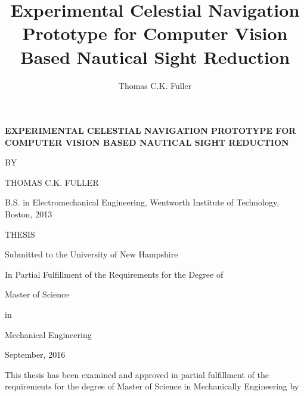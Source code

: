 \documentclass[12pt,a4paper]{book}
\author{Thomas C.K. Fuller}
\title{Experimental Celestial Navigation Prototype for Computer Vision Based Nautical Sight Reduction}
\begin{document}
\frontmatter
\begin{titlepage}
	\centering
	{\scshape\large \textbf{EXPERIMENTAL CELESTIAL NAVIGATION PROTOTYPE FOR COMPUTER VISION BASED NAUTICAL SIGHT REDUCTION}\par}
	\vspace{1.75cm}
	{\scshape\normalsize BY\par}
	\vspace{2.25cm}
	{\normalsize THOMAS C.K. FULLER\par}
	{\normalsize B.S. in Electromechanical Engineering, Wentworth Institute of Technology, Boston, 2013\par}
	
	\vspace{2cm}
	{\normalsize THESIS\par}
	\vspace{2.5cm}
	{\normalsize Submitted to the University of New Hampshire\par}
	{\normalsize In Partial Fulfillment of the Requirements for the Degree of\par}
	{\normalsize Master of Science\par}
	{\normalsize in\par}
	{\normalsize Mechanical Engineering\par}


	\vfill

	{\normalsize September, 2016\par}
\end{titlepage}
\begin{center}

\vspace{1cm}
\end{center}
\vspace{2cm}
This thesis has been examined and approved in partial fulfillment of the requirements for the degree of Master of Science in Mechanically Engineering by
\vspace{2cm}
\\
\hspace*{3cm}
\end{document}
